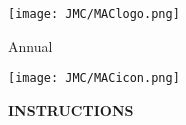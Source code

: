 \documentclass[10pt, twoside]{article}
\newcommand{\contestNumber}{10}
\newcommand{\contestName}{KMMC}
\newcommand{\nthAnnual}{4th}
\newcommand{\competitionName}{Karate Masters Mathematics Competitions}
\newcommand{\contestDate}{Thursday, November 1, 2022}
\begin{document}
\thispagestyle{empty}

\begin{center}
\begin{framed}
\begin{flushleft}
\hspace{2mm}\texttt{[image: JMC/MAClogo.png]}
\end{flushleft}
\vspace{0mm}
\begin{flushleft}
\hspace{2mm}\normalsize{{\selectfont {\competitionName}}}
\end{flushleft}
\vspace{-4mm}
\begin{flushleft}
\hspace{2mm}\normalsize{{\selectfont {\nthAnnual} Annual}}
\end{flushleft}
\vspace{3mm}
\begin{flushleft}
\hspace{1.5mm}\fontsize{30}{40}{{\fontfamily{phv}\selectfont {\contestName} \contestNumber
}}
\end{flushleft}
\vspace{-4mm}
\begin{flushleft}
\hspace{2mm}\normalsize{{\selectfont {\contestDate}}}
\end{flushleft}
\begin{flushright}
\vspace{-40mm}
\texttt{[image: JMC/MACicon.png]}
\end{flushright}
\vspace{-2mm}
\end{framed}
\end{center}
\vspace{-2.5mm}
\textbf{INSTRUCTIONS}
\vspace{-1.5mm}
\end{document}
